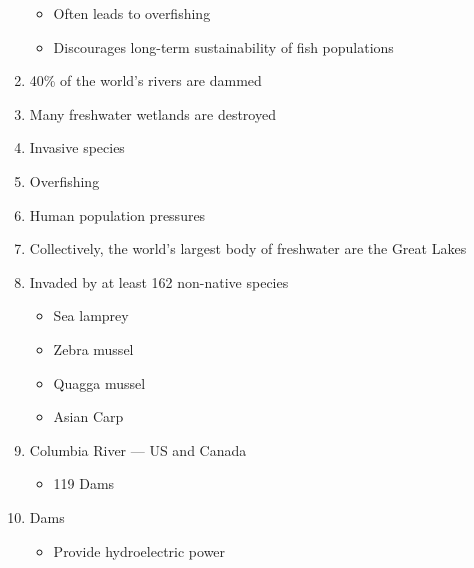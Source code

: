 \documentclass[12pt]{article}
\begin{document}
\begin{enumerate}
\begin{itemize}
      \item Often leads to overfishing

      \item Discourages long-term sustainability of fish populations

    \end{itemize}

  \item 40\% of the world's rivers are dammed

  \item Many freshwater wetlands are destroyed

  \item Invasive species

  \item Overfishing

  \item Human population pressures

  \item Collectively, the world's largest body of freshwater are the Great Lakes

  \item Invaded by at least 162 non-native species

    \begin{itemize}

      \item Sea lamprey

      \item Zebra mussel

      \item Quagga mussel

      \item Asian Carp

    \end{itemize}

  \item Columbia River — US and Canada

    \begin{itemize}

      \item 119 Dams

    \end{itemize}

  \item Dams

    \begin{itemize}

      \item Provide hydroelectric power


\end{itemize}
\end{enumerate}
\end{document}
